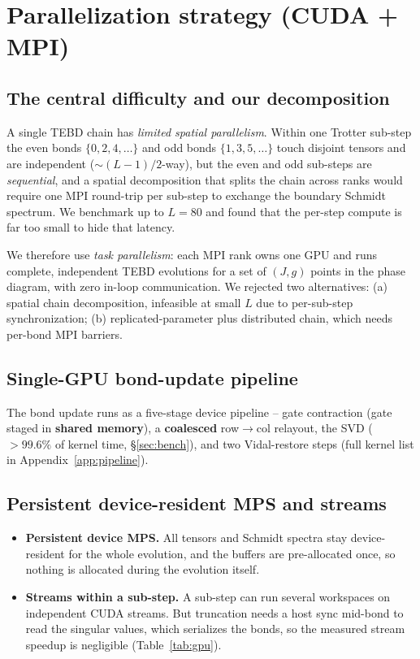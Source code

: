 \documentclass[11pt]{article}
\begin{document}
\section{Parallelization strategy (CUDA + MPI)}\label{sec:parallel}

\subsection{The central difficulty and our decomposition}

A single TEBD chain has \textit{limited spatial parallelism}. Within one Trotter sub-step the even bonds $\{0,2,4,\dots\}$ and odd bonds $\{1,3,5,\dots\}$ touch disjoint tensors and are independent ($\sim(L-1)/2$-way), but the even and odd sub-steps are \emph{sequential}, and a spatial decomposition that splits the chain across ranks would require one MPI round-trip per sub-step to exchange the boundary Schmidt spectrum. We benchmark up to $L=80$ and found that the per-step compute is far too small to hide that latency.

We therefore use \textit{task parallelism}: each MPI rank owns one GPU and runs complete, independent TEBD evolutions for a set of $(J,g)$ points in the phase diagram, with zero in-loop communication. We rejected two alternatives: (a) spatial chain decomposition, infeasible at small $L$ due to per-sub-step synchronization; (b) replicated-parameter plus distributed chain, which needs per-bond MPI barriers.

\subsection{Single-GPU bond-update pipeline}

The bond update runs as a five-stage device pipeline -- gate contraction (gate staged in \textbf{shared memory}), a \textbf{coalesced} row$\to$col relayout, the SVD ($>99.6\%$ of kernel time, \S\ref{sec:bench}), and two Vidal-restore steps (full kernel list in Appendix~\ref{app:pipeline}).

\subsection{Persistent device-resident MPS and streams}

\begin{itemize}
\item \textbf{Persistent device MPS.} All tensors and Schmidt spectra stay device-resident for the whole evolution, and the buffers are pre-allocated once, so nothing is allocated during the evolution itself.
\item \textbf{Streams within a sub-step.} A sub-step can run several workspaces on independent CUDA streams. But truncation needs a host sync mid-bond to read the singular values, which serializes the bonds, so the measured stream speedup is negligible (Table~\ref{tab:gpu}).
\end{itemize}
\end{document}
